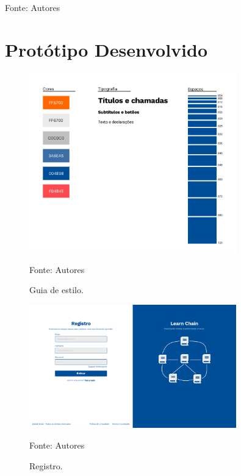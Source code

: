 \begin{apendicesenv}
\begin{table}[h]
    \vspace{5mm}
    {\footnotesize Fonte: Autores} 
\end{table}


\chapter{Protótipo Desenvolvido}

    \begin{figure}[h]
        \centering
        \caption{Guia de estilo.}
        \includegraphics[width=0.8\textwidth]{figuras/guia-de-estilo.png}
        \begin{center}
            {\footnotesize Fonte: Autores}
        \end{center}
        \label{fig:guia-de-estilo}
    \end{figure}

    \begin{figure}[h]
        \centering
        \caption{Registro.}
        \includegraphics[width=0.8\textwidth]{figuras/Registro.png}
        \begin{center}
            {\footnotesize Fonte: Autores}
        \end{center}
        \label{fig:Registro}
    \end{figure}


\end{apendicesenv}
